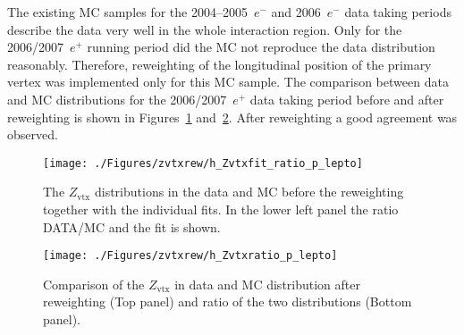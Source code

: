 The existing MC samples for the 2004--2005~$e^-$ and 2006~$e^-$ data taking periods describe the data very well in the whole interaction region. Only for the 2006/2007~$e^+$ running period did the MC not reproduce the data distribution reasonably. Therefore, reweighting of the longitudinal position of the primary vertex was implemented only for this MC sample. The comparison between data and MC distributions for the 2006/2007~$e^+$ data taking period before and after reweighting is shown in Figures~\ref{fig:zvtxrew} and~\ref{fig:zvtxrewaf}. After reweighting a good agreement was observed.
\begin{figure}[t]
\begin{center}
 \hspace{-35pt}\texttt{[image: ./Figures/zvtxrew/h\_Zvtxfit\_ratio\_p\_lepto]}%
\end{center}
\caption{The $Z_\text{vtx}$ distributions in the data and \lepto MC before the reweighting together with the individual fits. In the lower left panel the ratio DATA/MC and the fit is shown.} 
\label{fig:zvtxrew}
\end{figure}


\begin{figure}[p]
\begin{center}
 \texttt{[image: ./Figures/zvtxrew/h\_Zvtxratio\_p\_lepto]}
\end{center}
\caption{Comparison of the $Z_\text{vtx}$ in data and \lepto MC distribution after reweighting (Top panel) and ratio of the two distributions (Bottom panel).} 
\label{fig:zvtxrewaf}
\end{figure}